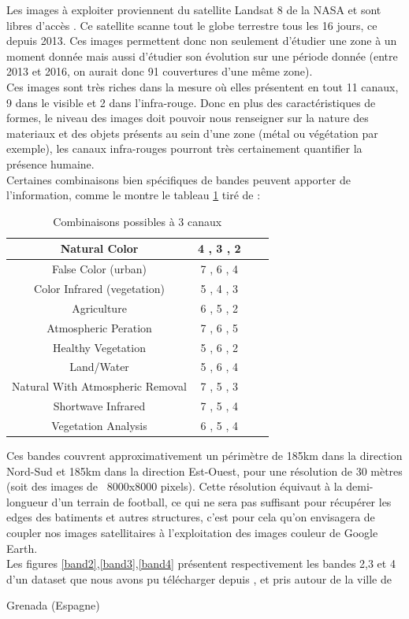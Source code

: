 \documentclass{book}
\begin{document}
Les images à exploiter proviennent du satellite Landsat 8 de la NASA et sont libres d'accès \cite{landsat8}. Ce satellite scanne tout le globe terrestre 
tous les 16 jours, ce depuis 2013. Ces images permettent donc non seulement d'étudier une zone à un moment donnée mais aussi d'étudier son évolution sur
une période donnée (entre 2013 et 2016, on aurait donc 91 couvertures d'une même zone).\\
Ces images sont très riches dans la mesure où elles présentent en tout 11 canaux, 9 dans le visible et 2 dans l'infra-rouge. Donc en plus des caractéristiques de formes, le niveau des images doit pouvoir nous renseigner sur 
la nature des materiaux et des objets présents au sein d'une zone (métal ou végétation par exemple), les canaux infra-rouges pourront très certainement
quantifier la présence humaine.\\
Certaines combinaisons bien spécifiques de bandes peuvent apporter de l'information, comme le montre le tableau \ref{combinaison}
tiré de \cite{esri}:
\begin{table}
\begin{center}
\begin{tabular}{|c|c|c|c|}
\hline
Natural Color & 4 , 3 , 2\\
\hline
False Color (urban) & 7 , 6 , 4\\
\hline
Color Infrared (vegetation) & 5 , 4 , 3\\
\hline
Agriculture & 6 , 5 , 2\\
\hline
Atmospheric Peration & 7 , 6 , 5\\
\hline
Healthy Vegetation & 5 , 6 , 2\\
\hline
Land/Water & 5 , 6 , 4\\
\hline
Natural With Atmospheric Removal & 7 , 5 , 3\\
\hline
Shortwave Infrared & 7 , 5 , 4\\
\hline
Vegetation Analysis & 6 , 5 , 4\\
\hline
\end{tabular}
\end{center}
\caption{Combinaisons possibles à 3 canaux}
\label{combinaison}
\end{table}
\clearpage
Ces bandes couvrent approximativement un périmètre de 185km dans la direction Nord-Sud et 185km
dans la direction Est-Ouest, pour une résolution de 30 mètres (soit des images de ~8000x8000 pixels). Cette
résolution équivaut à la demi-longueur d'un terrain de football, ce qui ne sera pas
suffisant pour récupérer les edges des batiments et autres structures, c'est pour cela qu'on envisagera de coupler nos images
satellitaires à l'exploitation des images couleur de Google Earth.\\
Les figures \ref{band2},\ref{band3},\ref{band4} présentent respectivement les bandes 2,3 et 4 d'un dataset que nous
avons pu télécharger depuis \cite{landsat8}, et pris autour de la ville
de \begin{itshape}Grenada (Espagne)\end{itshape}
\end{document}
